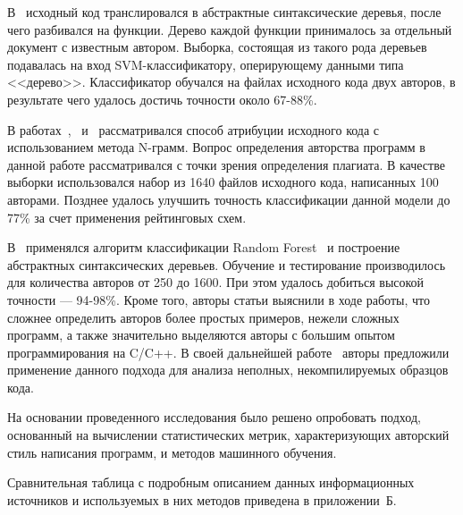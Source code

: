 В~\cite{pellin} исходный код транслировался в абстрактные синтаксические деревья, 
после чего разбивался на функции. Дерево каждой функции принималось за отдельный документ с известным автором. 
Выборка, состоящая из такого рода деревьев подавалась на вход SVM-классификатору, 
оперирующему данными типа <<дерево>>. Классификатор обучался на файлах исходного кода двух авторов, в результате чего удалось достичь точности около 67-88\%.

В работах~\cite{burrows},~\cite{burrows_big} и~\cite{burrows_3} рассматривался способ атрибуции исходного кода с использованием метода N-грамм. 
Вопрос определения авторства программ в данной работе рассматривался с точки зрения определения плагиата. 
В качестве выборки использовался набор из 1640 файлов исходного кода, написанных 100 авторами. Позднее 
удалось улучшить точность классификации данной модели до 77\% за счет применения рейтинговых схем.

В~\cite{caliskan} применялся алгоритм классификации Random Forest~\cite{random_forest} и построение 
абстрактных синтаксических деревьев. Обучение и тестирование производилось для 
количества авторов от 250 до 1600. При этом удалось добиться высокой точности --- 94-98\%. 
Кроме того, авторы статьи выяснили в ходе работы, что сложнее определить авторов более простых примеров, 
нежели сложных программ, а также значительно выделяются авторы с большим опытом программирования на C/C++. 
В своей дальнейшей работе~\cite{git_blame} авторы предложили применение данного подхода для анализа неполных, 
некомпилируемых образцов кода. 

На основании проведенного исследования было решено опробовать подход, основанный на вычислении 
статистических метрик, характеризующих авторский стиль написания программ, и методов машинного обучения. 

Сравнительная таблица с подробным описанием данных информационных источников и используемых в них методов 
приведена в приложении~Б.





